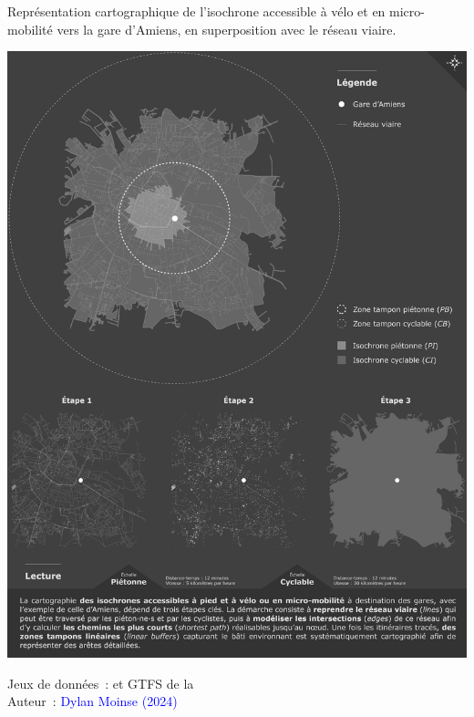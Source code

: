 \begin{refsegment}
    \begin{carte}[h!]\vspace*{4pt}
        \caption{Représentation cartographique de l'isochrone accessible à vélo et en micro-mobilité vers la gare d'Amiens, en superposition avec le réseau viaire.}
        \label{fig-chap3:isochrone-amiens-finale}
        \centerline{\includegraphics[width=1\columnwidth]{src/Figures/Chap-3/FR_Carte_Isochrones_Buffers_Amiens.png}}
        \vspace{5pt}
        \begin{flushright}\scriptsize{
        Jeux de données~: \textcolor{blue}{\textcite{openstreetmap_openstreetmap_2023}} et \acrshort{GTFS} de la \textcolor{blue}{\textcite{sncf_reseau_2024}}
        \\
        Auteur~: \textcolor{blue}{Dylan Moinse (2024)}
        }\end{flushright}
    \end{carte}


\end{refsegment}
